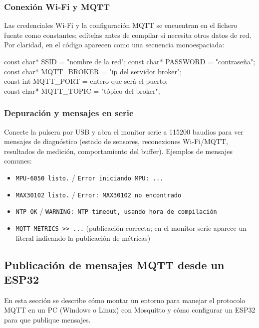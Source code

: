 \documentclass[12pt, a4paper]{article}
\begin{document}
\begin{umaappendices}
	\subsubsection{Conexión Wi-Fi y MQTT}
	Las credenciales Wi-Fi y la configuración MQTT se encuentran en el fichero fuente como constantes; edítelas antes de compilar si necesita otros datos de red. Por claridad, en el código aparecen como una secuencia monoespaciada:

	{\ttfamily\small
		const char* SSID     = "nombre de la red";
		const char* PASSWORD = "contraseña";\\
		const char* MQTT\_BROKER = "ip del servidor broker";\\
		const int   MQTT\_PORT   = entero que será el puerto;\\
		const char* MQTT\_TOPIC  = "tópico del broker";\\
	}	

	\subsubsection{Depuración y mensajes en serie}
	Conecte la pulsera por USB y abra el monitor serie a 115200 baudios para ver mensajes de diagnóstico (estado de sensores, reconexiones Wi-Fi/MQTT, resultados de medición, comportamiento del buffer). Ejemplos de mensajes comunes:
	
	\begin{itemize}
		\item \texttt{MPU-6050 listo.} / \texttt{Error iniciando MPU: ...}
		\item \texttt{MAX30102 listo.} / \texttt{Error: MAX30102 no encontrado}
		\item \texttt{NTP OK} / \texttt{WARNING: NTP timeout, usando hora de compilación}
		\item \texttt{MQTT METRICS \textgreater\textgreater\ ...} (publicación correcta; en el monitor serie aparece un literal indicando la publicación de métricas)
	\end{itemize}
	
	\newpage
	
		\subsection{Publicación de mensajes MQTT desde un ESP32}
	\label{sec:pub_mqtt_esp32}
	
	En esta sección se describe cómo montar un entorno para manejar el protocolo MQTT en un PC (Windows o Linux) con Mosquitto y cómo configurar un ESP32 para que publique mensajes.
	

\end{umaappendices}
\end{document}
